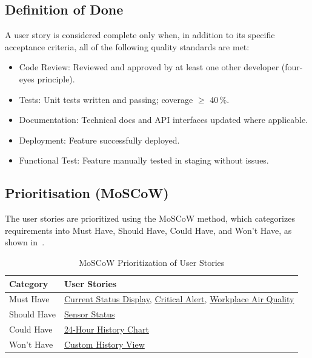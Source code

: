\documentclass[conference,a4paper,flushend]{cs-techrep} %
\begin{document}
\subsection{Definition of Done}\label{sec:definition_of_done}

A user story is considered complete only when, in addition to its specific acceptance criteria, all of the 
following quality standards are met:

\begin{itemize}
    \item Code Review: Reviewed and approved by at least one other developer (four-eyes principle).
    \item Tests: Unit tests written and passing; coverage $\ge$ 40\,\%.
    \item Documentation: Technical docs and API interfaces updated where applicable.
    \item Deployment: Feature successfully deployed.
    \item Functional Test: Feature manually tested in staging without issues.
\end{itemize}


\subsection{Prioritisation (MoSCoW)}\label{sec:prioritisation}

The user stories are prioritized using the MoSCoW method, which categorizes requirements into Must Have, 
Should Have, Could Have, and Won't Have, as shown in~. 

\begin{table}[!h]
    \centering
    \caption{MoSCoW Prioritization of User Stories}
    \label{tab:moscow_prioritization}
    \begin{tabularx}{0.9\linewidth}{>{\raggedright\arraybackslash}p{2.8cm} >{\raggedright\arraybackslash}X}
        \toprule
        \textbf{Category} & \textbf{User Stories} \\
        \midrule
        Must Have
        & \hyperref[sec:us_01]{Current Status Display}, \hyperref[sec:us_03]{Critical Alert}, \hyperref[sec:us_02]{Workplace Air Quality} \\
        Should Have
        & \hyperref[sec:us_06]{Sensor Status} \\
        Could Have
        & \hyperref[sec:us_04]{24-Hour History Chart} \\
        Won't Have
        & \hyperref[sec:us_05]{Custom History View} \\
        \bottomrule
    \end{tabularx}
\end{table}
\end{document}
